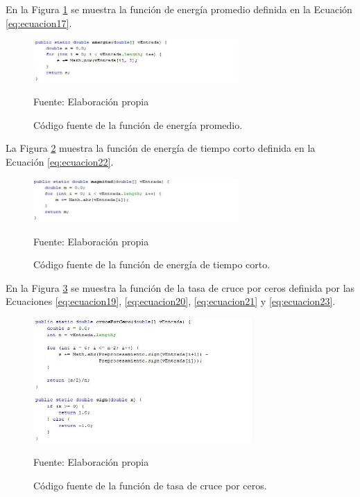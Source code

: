 \begin{enumerate}
En la Figura \ref{fig:figura3.12} se muestra la función de energía promedio definida en la Ecuación \eqref{eq:ecuacion17}.
\begin{figure}[H]
\captionsetup{justification=centering}
\begin{center}
\includegraphics[width=0.7\textwidth]{Imagenes/Cap3/image012}
\end{center}
\begin{center}
\vskip -0.5cm
\caption{\small{Código fuente de la función de energía promedio.}}
\label{fig:figura3.12}
{\small{Fuente: Elaboración propia}}
\end{center}
\end{figure}

La Figura \ref{fig:figura3.13} muestra la función de energía de tiempo corto definida en la Ecuación \eqref{eq:ecuacion22}.
\begin{figure}[H]
\captionsetup{justification=centering}
\begin{center}
\includegraphics[width=0.7\textwidth]{Imagenes/Cap3/image013}
\end{center}
\begin{center}
\vskip -0.5cm
\caption{\small{Código fuente de la función de energía de tiempo corto.}}
\label{fig:figura3.13}
{\small{Fuente: Elaboración propia}}
\end{center}
\end{figure}

En la Figura \ref{fig:figura3.14} se muestra la función de la tasa de cruce por ceros definida por las Ecuaciones \eqref{eq:ecuacion19}, \eqref{eq:ecuacion20}, \eqref{eq:ecuacion21} y \eqref{eq:ecuacion23}.
\begin{figure}[H]
\captionsetup{justification=centering}
\begin{center}
\includegraphics[width=0.75\textwidth]{Imagenes/Cap3/image014}
\end{center}
\begin{center}
\vskip -0.5cm
\caption{\small{Código fuente de la función de tasa de cruce por ceros.}}
\label{fig:figura3.14}
{\small{Fuente: Elaboración propia}}
\end{center}
\end{figure}


\end{enumerate}
